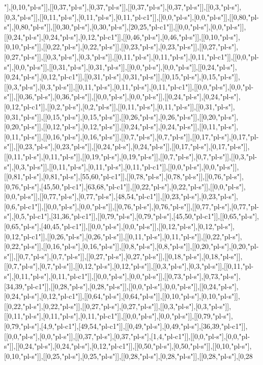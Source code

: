 "],[0,10,"pl-s"]],[[0,37,"pl-s"],[0,37,"pl-s"]],[[0,37,"pl-s"],[0,37,"pl-s"]],[[0,3,"pl-s"],[0,3,"pl-s"]],[[0,11,"pl-s"],[0,11,"pl-s"],[0,11,"pl-c1"]],[[0,0,"pl-s"],[0,0,"pl-s"]],[[0,80,"pl-s"],[0,80,"pl-s"]],[[0,30,"pl-s"],[0,30,"pl-s"],[20,25,"pl-c1"]],[[0,0,"pl-s"],[0,0,"pl-s"]],[[0,24,"pl-s"],[0,24,"pl-s"],[0,12,"pl-c1"]],[[0,46,"pl-s"],[0,46,"pl-s"]],[[0,10,"pl-s"],[0,10,"pl-s"]],[[0,22,"pl-s"],[0,22,"pl-s"]],[[0,23,"pl-s"],[0,23,"pl-s"]],[[0,27,"pl-s"],[0,27,"pl-s"]],[[0,3,"pl-s"],[0,3,"pl-s"]],[[0,11,"pl-s"],[0,11,"pl-s"],[0,11,"pl-c1"]],[[0,0,"pl-s"],[0,0,"pl-s"]],[[0,31,"pl-s"],[0,31,"pl-s"]],[[0,0,"pl-s"],[0,0,"pl-s"]],[[0,24,"pl-s"],[0,24,"pl-s"],[0,12,"pl-c1"]],[[0,31,"pl-s"],[0,31,"pl-s"]],[[0,15,"pl-s"],[0,15,"pl-s"]],[[0,3,"pl-s"],[0,3,"pl-s"]],[[0,11,"pl-s"],[0,11,"pl-s"],[0,11,"pl-c1"]],[[0,0,"pl-s"],[0,0,"pl-s"]],[[0,36,"pl-s"],[0,36,"pl-s"]],[[0,0,"pl-s"],[0,0,"pl-s"]],[[0,24,"pl-s"],[0,24,"pl-s"],[0,12,"pl-c1"]],[[0,2,"pl-s"],[0,2,"pl-s"]],[[0,11,"pl-s"],[0,11,"pl-s"]],[[0,31,"pl-s"],[0,31,"pl-s"]],[[0,15,"pl-s"],[0,15,"pl-s"]],[[0,26,"pl-s"],[0,26,"pl-s"]],[[0,20,"pl-s"],[0,20,"pl-s"]],[[0,12,"pl-s"],[0,12,"pl-s"]],[[0,24,"pl-s"],[0,24,"pl-s"]],[[0,11,"pl-s"],[0,11,"pl-s"]],[[0,16,"pl-s"],[0,16,"pl-s"]],[[0,7,"pl-s"],[0,7,"pl-s"]],[[0,17,"pl-s"],[0,17,"pl-s"]],[[0,23,"pl-s"],[0,23,"pl-s"]],[[0,24,"pl-s"],[0,24,"pl-s"]],[[0,17,"pl-s"],[0,17,"pl-s"]],[[0,11,"pl-s"],[0,11,"pl-s"]],[[0,19,"pl-s"],[0,19,"pl-s"]],[[0,7,"pl-s"],[0,7,"pl-s"]],[[0,3,"pl-s"],[0,3,"pl-s"]],[[0,11,"pl-s"],[0,11,"pl-s"],[0,11,"pl-c1"]],[[0,0,"pl-s"],[0,0,"pl-s"]],[[0,81,"pl-s"],[0,81,"pl-s"],[55,60,"pl-c1"]],[[0,78,"pl-s"],[0,78,"pl-s"]],[[0,76,"pl-s"],[0,76,"pl-s"],[45,50,"pl-c1"],[63,68,"pl-c1"]],[[0,22,"pl-s"],[0,22,"pl-s"]],[[0,0,"pl-s"],[0,0,"pl-s"]],[[0,77,"pl-s"],[0,77,"pl-s"],[48,54,"pl-c1"]],[[0,23,"pl-s"],[0,23,"pl-s"],[0,6,"pl-c1"]],[[0,0,"pl-s"],[0,0,"pl-s"]],[[0,76,"pl-s"],[0,76,"pl-s"]],[[0,77,"pl-s"],[0,77,"pl-s"],[0,5,"pl-c1"],[31,36,"pl-c1"]],[[0,79,"pl-s"],[0,79,"pl-s"],[45,50,"pl-c1"]],[[0,65,"pl-s"],[0,65,"pl-s"],[40,45,"pl-c1"]],[[0,0,"pl-s"],[0,0,"pl-s"]],[[0,12,"pl-s"],[0,12,"pl-s"],[0,12,"pl-c1"]],[[0,26,"pl-s"],[0,26,"pl-s"]],[[0,11,"pl-s"],[0,11,"pl-s"]],[[0,22,"pl-s"],[0,22,"pl-s"]],[[0,16,"pl-s"],[0,16,"pl-s"]],[[0,8,"pl-s"],[0,8,"pl-s"]],[[0,20,"pl-s"],[0,20,"pl-s"]],[[0,7,"pl-s"],[0,7,"pl-s"]],[[0,27,"pl-s"],[0,27,"pl-s"]],[[0,18,"pl-s"],[0,18,"pl-s"]],[[0,7,"pl-s"],[0,7,"pl-s"]],[[0,12,"pl-s"],[0,12,"pl-s"]],[[0,3,"pl-s"],[0,3,"pl-s"]],[[0,11,"pl-s"],[0,11,"pl-s"],[0,11,"pl-c1"]],[[0,0,"pl-s"],[0,0,"pl-s"]],[[0,73,"pl-s"],[0,73,"pl-s"],[34,39,"pl-c1"]],[[0,28,"pl-s"],[0,28,"pl-s"]],[[0,0,"pl-s"],[0,0,"pl-s"]],[[0,24,"pl-s"],[0,24,"pl-s"],[0,12,"pl-c1"]],[[0,64,"pl-s"],[0,64,"pl-s"]],[[0,10,"pl-s"],[0,10,"pl-s"]],[[0,22,"pl-s"],[0,22,"pl-s"]],[[0,27,"pl-s"],[0,27,"pl-s"]],[[0,3,"pl-s"],[0,3,"pl-s"]],[[0,11,"pl-s"],[0,11,"pl-s"],[0,11,"pl-c1"]],[[0,0,"pl-s"],[0,0,"pl-s"]],[[0,79,"pl-s"],[0,79,"pl-s"],[4,9,"pl-c1"],[49,54,"pl-c1"]],[[0,49,"pl-s"],[0,49,"pl-s"],[36,39,"pl-c1"]],[[0,0,"pl-s"],[0,0,"pl-s"]],[[0,37,"pl-s"],[0,37,"pl-s"],[1,4,"pl-c1"]],[[0,0,"pl-s"],[0,0,"pl-s"]],[[0,24,"pl-s"],[0,24,"pl-s"],[0,12,"pl-c1"]],[[0,50,"pl-s"],[0,50,"pl-s"]],[[0,10,"pl-s"],[0,10,"pl-s"]],[[0,25,"pl-s"],[0,25,"pl-s"]],[[0,28,"pl-s"],[0,28,"pl-s"]],[[0,28,"pl-s"],[0,28